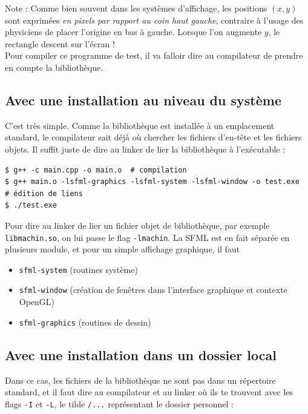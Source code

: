 \documentclass{book}
\def\filename{\texttt}
\begin{document}
Note : Comme bien souvent dans les systèmes d'affichage, les positions $(x,y)$ sont exprimées \emph{en pixels par rapport au coin haut gauche}, contraire à l'usage des physiciens de placer l'origine en bas à gauche. Lorsque l'on augmente $y$, le rectangle descent sur l'écran !\\

Pour compiler ce programme de test, il va falloir dire au compilateur de prendre en compte la bibliothèque.

\subsection{Avec une installation au niveau du système}

C'est très simple. Comme la bibliothèque est installée à un emplacement standard, le compilateur sait déjà où chercher les fichiers d'en-tête et les fichiers objets. Il suffit juste de dire au linker de lier la bibliothèque à l'exécutable :

\begin{verbatim}
$ g++ -c main.cpp -o main.o  # compilation
$ g++ main.o -lsfml-graphics -lsfml-system -lsfml-window -o test.exe  # édition de liens
$ ./test.exe
\end{verbatim}

Pour dire au linker de lier un fichier objet de bibliothèque, par exemple \filename{libmachin.so}, on lui passe le flag \texttt{-lmachin}. La SFML est en fait séparée en plusieurs module, et pour un simple affichage graphique, il faut
\begin{itemize}
  \item \texttt{sfml-system} (routines système)
  \item \texttt{sfml-window} (création de fenêtres dans l'interface graphique et contexte OpenGL)
  \item \texttt{sfml-graphics} (routines de dessin)
\end{itemize}

\subsection{Avec une installation dans un dossier local}

Dans ce cas, les fichiers de la bibliothèque ne sont pas dans un répertoire standard, et il faut dire au compilateur et au linker où ils te trouvent avec les flags \texttt{-I} et \texttt{-L}, le tilde \texttt{\raisebox{0.5ex}{\texttildelow}/...} représentant le dossier personnel :
\end{document}
